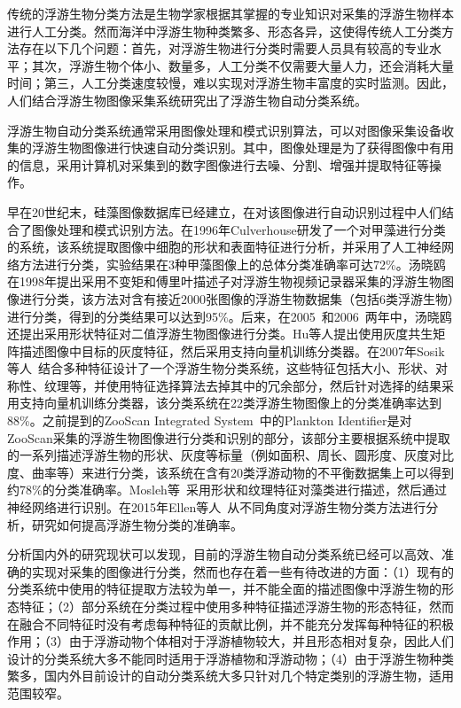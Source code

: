 传统的浮游生物分类方法是生物学家根据其掌握的专业知识对采集的浮游生物样本进行人工分类。然而海洋中浮游生物种类繁多、形态各异，这使得传统人工分类方法存在以下几个问题：首先，对浮游生物进行分类时需要人员具有较高的专业水平；其次，浮游生物个体小、数量多，人工分类不仅需要大量人力，还会消耗大量时间；第三，人工分类速度较慢，难以实现对浮游生物丰富度的实时监测。因此，人们结合浮游生物图像采集系统研究出了浮游生物自动分类系统。

浮游生物自动分类系统通常采用图像处理和模式识别算法，可以对图像采集设备收集的浮游生物图像进行快速自动分类识别。其中，图像处理是为了获得图像中有用的信息，采用计算机对采集到的数字图像进行去噪、分割、增强并提取特征等操作。

早在20世纪末，硅藻图像数据库已经建立，在对该图像进行自动识别过程中人们结合了图像处理和模式识别方法。在1996年Culverhouse研发了一个对甲藻进行分类的系统，该系统提取图像中细胞的形状和表面特征进行分析，并采用了人工神经网络方法进行分类，实验结果在3种甲藻图像上的总体分类准确率可达72\%。汤晓鸥在1998年\cite{tang1998automatic}提出采用不变矩和傅里叶描述子对浮游生物视频记录器采集的浮游生物图像进行分类，该方法对含有接近2000张图像的浮游生物数据集（包括6类浮游生物）进行分类，得到的分类结果可以达到95\%。后来，在2005~\cite{zhao2005binary}和2006~\cite{tang2006binary}两年中，汤晓鸥还提出采用形状特征对二值浮游生物图像进行分类。Hu等人提出使用灰度共生矩阵描述图像中目标的灰度特征，然后采用支持向量机训练分类器。在2007年Sosik等人~\cite{sosik2007automated}结合多种特征设计了一个浮游生物分类系统，这些特征包括大小、形状、对称性、纹理等，并使用特征选择算法去掉其中的冗余部分，然后针对选择的结果采用支持向量机训练分类器，该分类系统在22类浮游生物图像上的分类准确率达到88\%。之前提到的ZooScan Integrated System~\cite{gorsky2010digital}中的Plankton Identifier是对ZooScan采集的浮游生物图像进行分类和识别的部分，该部分主要根据系统中提取的一系列描述浮游生物的形状、灰度等标量（例如面积、周长、圆形度、灰度对比度、曲率等）来进行分类，该系统在含有20类浮游动物的不平衡数据集上可以得到约78\%的分类准确率。Mosleh等~\cite{mosleh2012preliminary}采用形状和纹理特征对藻类进行描述，然后通过神经网络进行识别。在2015年Ellen等人~\cite{Quantifying2015Ellen}从不同角度对浮游生物分类方法进行分析，研究如何提高浮游生物分类的准确率。

分析国内外的研究现状可以发现，目前的浮游生物自动分类系统已经可以高效、准确的实现对采集的图像进行分类，然而也存在着一些有待改进的方面：（1）现有的分类系统中使用的特征提取方法较为单一，并不能全面的描述图像中浮游生物的形态特征；（2）部分系统在分类过程中使用多种特征描述浮游生物的形态特征，然而在融合不同特征时没有考虑每种特征的贡献比例，并不能充分发挥每种特征的积极作用；（3）由于浮游动物个体相对于浮游植物较大，并且形态相对复杂，因此人们设计的分类系统大多不能同时适用于浮游植物和浮游动物；（4）由于浮游生物种类繁多，国内外目前设计的自动分类系统大多只针对几个特定类别的浮游生物，适用范围较窄。

